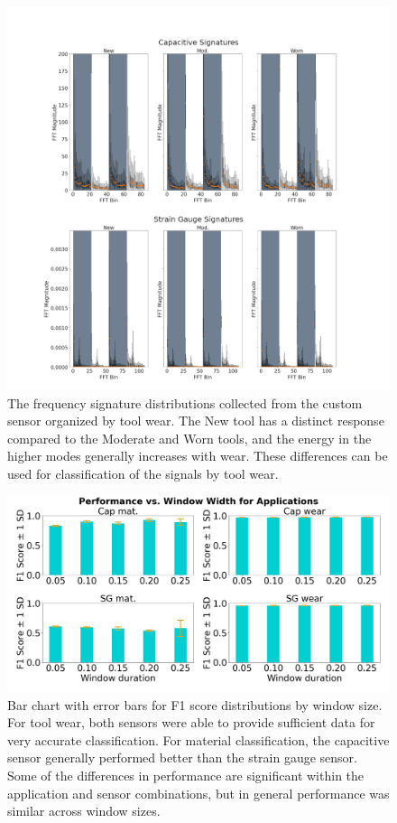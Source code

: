 \begin{figure}[t!]
\centering
\centerline{\includegraphics[width=5.5in]{figures/p1_media/Fig9.png}}
\caption{
The frequency signature distributions collected from the custom sensor organized by tool wear.
The New tool has a distinct response compared to the Moderate and Worn tools, and the 
 energy in the higher modes generally increases with wear.
These differences can be used for classification of the signals by tool wear.
}
\label{fig:wearsigs}
\end{figure}

\begin{figure}[t!]
\centering
\centerline{\includegraphics[width=5.5in]{figures/p1_media/Fig10.png}}
\caption{
Bar chart with error bars for F1 score distributions by window size. For tool wear, both
 sensors were able to provide sufficient data for very accurate classification.
For material classification, the capacitive sensor generally performed better than the
 strain gauge sensor. Some of the differences in performance are significant within the 
 application and sensor combinations, but in general performance was similar across window sizes.
}
\label{fig:windows}
\end{figure}

